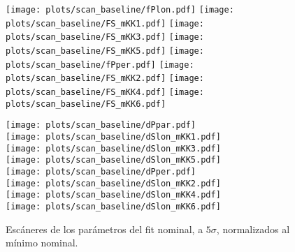 \begin{subappendices}

\begin{figure}[H]
  \begin{multicols}{2}
  \centering
  \texttt{[image: plots/scan\_baseline/fPlon.pdf]}  
  \texttt{[image: plots/scan\_baseline/FS\_mKK1.pdf]}  
  \texttt{[image: plots/scan\_baseline/FS\_mKK3.pdf]}  
  \texttt{[image: plots/scan\_baseline/FS\_mKK5.pdf]}  
  \texttt{[image: plots/scan\_baseline/fPper.pdf]}  
  \texttt{[image: plots/scan\_baseline/FS\_mKK2.pdf]}  
  \texttt{[image: plots/scan\_baseline/FS\_mKK4.pdf]}  
  \texttt{[image: plots/scan\_baseline/FS\_mKK6.pdf]}  
  \end{multicols}
\end{figure}
\newpage


\begin{figure}[H]
  \centering
  \begin{multicols}{2}
  \texttt{[image: plots/scan\_baseline/dPpar.pdf]}  \\
  \texttt{[image: plots/scan\_baseline/dSlon\_mKK1.pdf]}    \\
  \texttt{[image: plots/scan\_baseline/dSlon\_mKK3.pdf]}   \\ 
  \texttt{[image: plots/scan\_baseline/dSlon\_mKK5.pdf]}  \\  
  \texttt{[image: plots/scan\_baseline/dPper.pdf]}    \\
  \texttt{[image: plots/scan\_baseline/dSlon\_mKK2.pdf]}   \\ 
  \texttt{[image: plots/scan\_baseline/dSlon\_mKK4.pdf]}   \\ 
  \texttt{[image: plots/scan\_baseline/dSlon\_mKK6.pdf]}
  \end{multicols}  
  \caption{Escáneres de los  parámetros del fit nominal, a $5\sigma$, normalizados al mínimo nominal.} \label{fig:scansmc}
\end{figure}



\end{subappendices}
